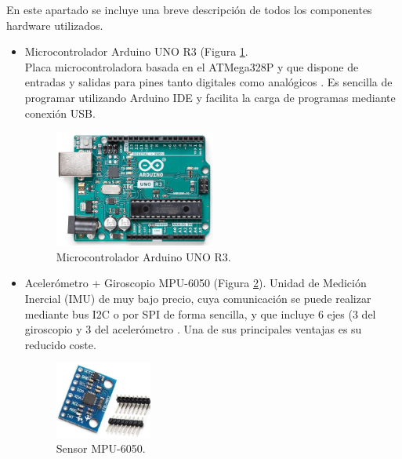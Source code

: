 En este apartado se incluye una breve descripción de todos los componentes hardware utilizados.
\begin{itemize}
    \item Microcontrolador Arduino UNO R3 (Figura \ref{fig:arduinoUNO}.\\
    Placa microcontroladora basada en el ATMega328P y que dispone de entradas y salidas para pines tanto digitales como analógicos \cite{ArduinoUNO82:online}. Es sencilla de programar utilizando Arduino IDE y facilita la carga de programas mediante conexión USB.

    \begin{figure}[h]
        \centering
        \includegraphics[width=0.5\textwidth]{img/4.TecnicasHerramientas/ArduinoUNO.png}
        \caption{Microcontrolador Arduino UNO R3. \cite{ArduinoUNO82:online}}
        \label{fig:arduinoUNO}
    \end{figure}
    
    \item Acelerómetro + Giroscopio MPU-6050 (Figura \ref{fig:mpu}).
    Unidad de Medición Inercial (IMU) de muy bajo precio, cuya comunicación se puede realizar mediante bus I2C o por SPI de forma sencilla, y que incluye 6 ejes (3 del giroscopio y 3 del acelerómetro \cite{MPU605015:online}. Una de sus principales ventajas es su reducido coste.
    
    \begin{figure}[h]
        \centering
        \includegraphics[width=0.3\textwidth]{img/4.TecnicasHerramientas/MPU6050.png}
        \caption{Sensor MPU-6050. \cite{MPU6050Amazon396:online}}
        \label{fig:mpu}
    \end{figure}
    

\end{itemize}
